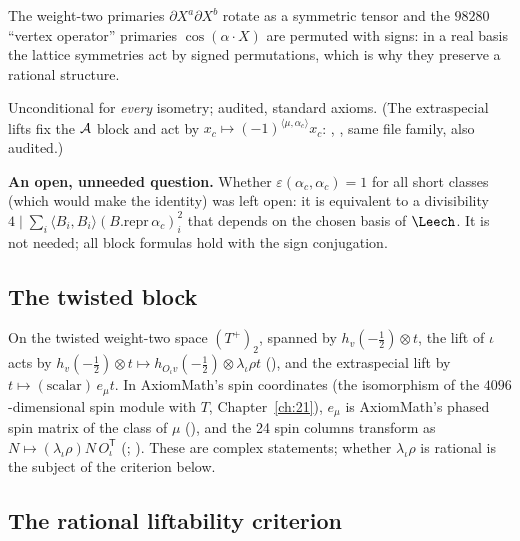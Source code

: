 \begin{physics}
The weight-two primaries $\partial X^a\partial X^b$ rotate as a symmetric tensor and the $98280$ ``vertex operator''
primaries $\cos(\alpha\cdot X)$ are permuted with signs: in a real basis the lattice symmetries act by signed
permutations, which is why they preserve a rational structure.
\end{physics}
\begin{status}Unconditional for \emph{every} isometry; audited, standard axioms.  (The extraspecial lifts fix the
$\mathcal{A}$ block and act by $x_c\mapsto(-1)^{\langle\mu,\alpha_c\rangle}x_c$: ,
, same file family, also audited.)\end{status}

\begin{warning}
\textbf{An open, unneeded question.}  Whether $\varepsilon(\alpha_c,\alpha_c)=1$ for all short classes (which would make
 the identity) was left open: it is equivalent to a divisibility $4\mid\sum_i\langle B_i,B_i\rangle
(B.\mathrm{repr}\,\alpha_c)_i^2$ that depends on the chosen basis of $\Leech$.  It is not needed; all block formulas hold
with the sign conjugation.
\end{warning}

\subsection{The twisted block}

On the twisted weight-two space $(T^+)_2$, spanned by $h_v(-\tfrac12)\otimes t$, the lift of $\iota$ acts by
$h_v(-\tfrac12)\otimes t\mapsto h_{O_\iota v}(-\tfrac12)\otimes \lambda_\iota\rho t$ (), and the extraspecial lift by
$t\mapsto(\text{scalar})\,e_\mu t$.  In AxiomMath's spin coordinates (the isomorphism  of the
$4096$-dimensional spin module with $T$, Chapter~\ref{ch:21}), $e_\mu$ is AxiomMath's phased spin matrix
 of the class of $\mu$ (), and the 24 spin columns transform as $N\mapsto
(\lambda_\iota\rho)N\,O_\iota^{\mathsf T}$ (; ).  These are
complex statements; whether $\lambda_\iota\rho$ is rational is the subject of the criterion below.

\subsection{The rational liftability criterion}

